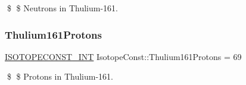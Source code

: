 \$ \$ Neutrons in Thulium-\/161. \mbox{\label{group___isotope_const-_thulium-_tm161_gaeb22cb5d3062ce9fa0f24e81f3d46e0a}} 
\subsubsection{\texorpdfstring{Thulium161\+Protons}{Thulium161Protons}}
{\footnotesize\ttfamily \mbox{\hyperlink{group___isotope_const-_macros_ga5f18360b3e99483a35c32d789e62621c}{I\+S\+O\+T\+O\+P\+E\+C\+O\+N\+S\+T\+\_\+\+I\+NT}} Isotope\+Const\+::\+Thulium161\+Protons = 69}

\$ \$ Protons in Thulium-\/161. 